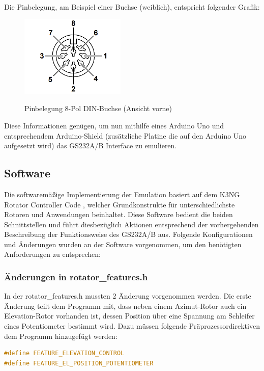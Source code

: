 Die Pinbelegung, am Beispiel einer Buchse (weiblich), entspricht folgender Grafik: 
\begin{figure}[H]
	\centering
	\includegraphics[width=5cm]{../ref/RotorInterfacePinbelegung.png}
	\label{fig:Rotor_Interface_Pinbelegung}
	\caption{Pinbelegung 8-Pol DIN-Buchse (Ansicht vorne) \cite{noauthor_yaesu_nodate}}
\end{figure}

Diese Informationen genügen, um nun mithilfe eines Arduino Uno und entsprechendem Arduino-Shield (zusätzliche Platine die auf den Arduino Uno aufgesetzt wird) das GS232A/B Interface zu emulieren.

\subsection{Software}
Die softwaremäßige Implementierung der Emulation basiert auf dem K3NG Rotator Controller Code \cite{good_k3ngk3ng_rotator_controller_2024}, welcher Grundkonstrukte für unterschiedlichste Rotoren und Anwendungen beinhaltet. Diese Software bedient die beiden Schnittstellen und führt diesbezüglich Aktionen entsprechend der vorhergehenden Beschreibung der Funktionsweise des GS232A/B aus. Folgende Konfigurationen und Änderungen wurden an der Software vorgenommen, um den benötigten Anforderungen zu entsprechen:

\subsubsection{Änderungen in rotator\_features.h}
In der rotator\_features.h mussten 2 Änderung vorgenommen werden. Die erste Änderung teilt dem Programm mit, dass neben einem Azimut-Rotor auch ein Elevation-Rotor vorhanden ist, dessen Position über eine Spannung am Schleifer eines Potentiometer bestimmt wird. Dazu müssen folgende Präprozessordirektiven dem Programm hinzugefügt werden:

\begin{lstlisting}[language=C++]
#define FEATURE_ELEVATION_CONTROL
#define FEATURE_EL_POSITION_POTENTIOMETER
\end{lstlisting}

